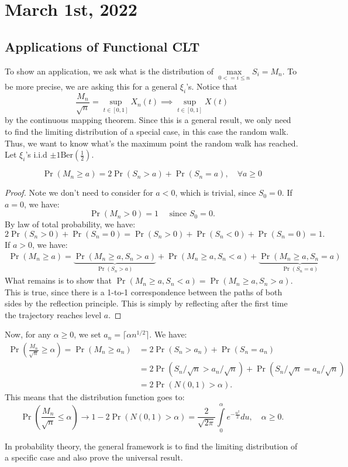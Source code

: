 \documentclass[../main/main.tex]{subfiles}
\begin{document}
\section{March 1st, 2022}
\subsection{Applications of Functional CLT}
To show an application, we ask what is the distribution of $\max\limits_{0<= i \leq n} S_i = M_n$. To be more precise, we are asking this for a general $\xi_i$'s. Notice that  \[
	\frac{M_n}{\sqrt{n}} = \sup\limits_{t \in [0,1]} X_n(t) \implies \sup\limits_{t \in [0,1]} X(t)
\] by the continuous mapping theorem. Since this is a general result, we only need to find the limiting distribution of a special case, in this case the random walk. Thus, we want to know what's the maximum point the random walk has reached. Let $\xi_i$'s i.i.d $\pm 1 \text{Ber}(\frac{1}{2})$.

\begin{claim}
	\[
		\Pr(M_n \geq a) = 2 \Pr(S_n > a) + \Pr(S_n = a), \quad \forall a \geq 0
	\]
\end{claim}

\begin{proof}
	Note we don't need to consider for $a < 0$, which is trivial, since $S_0 = 0$. If $a = 0$, we have: \[
		\Pr(M_n > 0 ) = 1 \quad \text{ since }S_0 = 0.
	\] By law of total probability, we have: \[
		2 \Pr(S_n > 0) + \Pr(S_n = 0) = \Pr(S_n > 0) + \Pr(S_n < 0) + \Pr(S_n = 0) = 1.
	\]
	If $a > 0$, we have:
	\begin{align*}
		\Pr(M_n \geq a) = \underbrace{\Pr(M_n  \geq a, S_n > a)}_{\Pr(S_n > a)} + \Pr(M_n \geq a , S_n < a) + \underbrace{\Pr(M_n \geq a, S_n = a)}_{ \Pr(S_n = a)}
	\end{align*}
	What remains is to show that $\Pr(M_n \geq a, S_n < a) = \Pr(M_n \geq a, S_n > a)$. This is true, since there is a 1-to-1 correspondence between the paths of both sides by the reflection principle. This is simply by reflecting after the first time the trajectory reaches level $a$.
\end{proof}
Now, for any $\alpha \geq 0$, we set $a_n = \lceil \alpha n^{1 / 2}\rceil$. We have:
\begin{align*}
	\Pr \left( \frac{M_n}{\sqrt{n}} \geq \alpha \right) = \Pr(M_n \geq a_n) & = 2\Pr(S_n > a_n) + \Pr(S_n = a_n)                                           \\
	                                                                        & =  2\Pr(S_n / \sqrt{n} > a_n/ \sqrt{n}) + \Pr(S_n/ \sqrt{n} = a_n/ \sqrt{n}) \\
	                                                                        & = 2 \Pr(N(0,1) > \alpha).
\end{align*}
This means that the distribution function goes to: \[
	\Pr \left( \frac{M_n}{\sqrt{n}}\leq \alpha \right) \to 1-2 \Pr(N(0,1) > \alpha) = \frac{2}{\sqrt{2 \pi}} \int\limits_{0}^{\alpha} e^{- \frac{u^2}{2}}du , \quad \alpha \geq 0.
\]
\begin{remark}
	In probability theory, the general framework is to find the limiting distribution of a specific case and also prove the universal result.
\end{remark}
\end{document}
